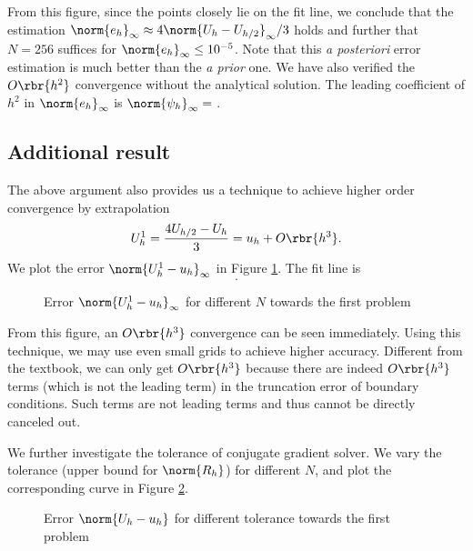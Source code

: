 \documentclass[english, nochinese]{pnote}
\newcommand\normi[1]{\norm{#1}_{\infty}}
\begin{document}
From this figure, since the points closely lie on the fit line, we conclude that the estimation $ \normi{e_h} \approx 4 \normi{ U_h - U_{ h / 2 } } / 3 $ holds and further that $ N = 256 $ suffices for $ \normi{e_h} \le 10^{-5} $. Note that this \textit{a posteriori} error estimation is much better than the \textit{a prior} one. We have also verified the $ O \rbr{h^2} $ convergence without the analytical solution. The leading coefficient of $h^2$ in $\normi{e_h}$ is $ \normi{\psi_h} = \text{} $.

\subsection{Additional result}

The above argument also provides us a technique to achieve higher order convergence by extrapolation
\begin{equation} \label{Eq:Extra}
U_h^1 = \frac{ 4 U_{ h / 2 } - U_h }{3} = u_h + O \rbr{h^3}.
\end{equation}
We plot the error $ \normi{ U_h^1 - u_h } $ in Figure \ref{Fig:Prob1Extra}. The fit line is
\begin{equation}
.
\end{equation}

\begin{figure}[htbp]
\centering

\caption{Error $ \normi{ U_h^1 - u_h } $ for different $N$ towards the first problem}
\label{Fig:Prob1Extra}
\end{figure}

From this figure, an $ O \rbr{h^3} $ convergence can be seen immediately. Using this technique, we may use even small grids to achieve higher accuracy. Different from the textbook, we can only get $ O \rbr{h^3} $ because there are indeed $ O \rbr{h^3} $ terms (which is not the leading term) in the truncation error of boundary conditions. Such terms are not leading terms and thus cannot be directly canceled out.

We further investigate the tolerance of conjugate gradient solver. We vary the tolerance (upper bound for $\norm{R_h}$) for different $N$, and plot the corresponding curve in Figure \ref{Fig:Prob1Tol}.

\begin{figure}[htbp]
\centering

\caption{Error $ \norm{ U_h - u_h } $ for different tolerance towards the first problem}
\label{Fig:Prob1Tol}
\end{figure}
\end{document}
